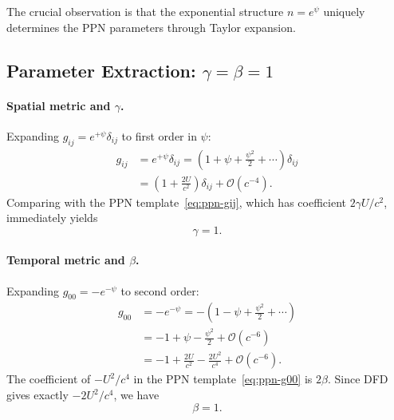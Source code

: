 The crucial observation is that the exponential structure $n = e^{\psi}$ uniquely determines the PPN parameters through Taylor expansion.

\subsection{Parameter Extraction: \texorpdfstring{$\gamma = \beta = 1$}{gamma = beta = 1}}\label{sec:ppn-gamma-beta}

\paragraph{Spatial metric and $\gamma$.}
Expanding $g_{ij} = e^{+\psi}\delta_{ij}$ to first order in $\psi$:
\begin{equation}
\begin{split}
g_{ij} &= e^{+\psi}\delta_{ij} = \left(1 + \psi + \frac{\psi^2}{2} + \cdots\right)\delta_{ij} \\
&= \left(1 + \frac{2U}{c^2}\right)\delta_{ij} + \mathcal{O}(c^{-4}).
\end{split}
\end{equation}
Comparing with the PPN template~\eqref{eq:ppn-gij}, which has coefficient $2\gamma U/c^2$, immediately yields
\begin{equation}\label{eq:gamma-one}
\boxed{\gamma = 1}.
\end{equation}

\paragraph{Temporal metric and $\beta$.}
Expanding $g_{00} = -e^{-\psi}$ to second order:
\begin{align}
g_{00} &= -e^{-\psi} = -\left(1 - \psi + \frac{\psi^2}{2} + \cdots\right) \nonumber\\
&= -1 + \psi - \frac{\psi^2}{2} + \mathcal{O}(c^{-6}) \nonumber\\
&= -1 + \frac{2U}{c^2} - \frac{2U^2}{c^4} + \mathcal{O}(c^{-6}).
\end{align}
The coefficient of $-U^2/c^4$ in the PPN template~\eqref{eq:ppn-g00} is $2\beta$. Since DFD gives exactly $-2U^2/c^4$, we have
\begin{equation}\label{eq:beta-one}
\boxed{\beta = 1}.
\end{equation}


